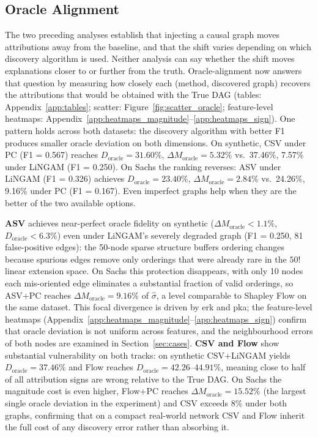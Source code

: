 \documentclass[12pt,letterpaper,twocolumn]{article}
\begin{document}
\subsection{Oracle Alignment}
\label{sec:oracle_align}

The two preceding analyses establish that injecting a causal graph moves attributions
away from the baseline, and that the shift varies depending on which discovery algorithm
is used. Neither analysis can say whether the shift moves explanations closer to or
further from the truth. Oracle-alignment now answers that question by measuring how
closely each (method, discovered graph) recovers the attributions that would be obtained
with the True DAG (tables: Appendix~\ref{app:tables}; scatter:
Figure~\ref{fig:scatter_oracle}; feature-level heatmaps:
Appendix~\ref{app:heatmaps_magnitude}--\ref{app:heatmaps_sign}). One pattern holds across both datasets: the discovery algorithm with better F1 produces smaller oracle deviation on
both dimensions. On synthetic, CSV under PC (F1 = 0.567) reaches
$D_{\text{oracle}} = 31.60\%$, $\Delta M_{\text{oracle}} = 5.32\%$ vs.\ 37.46\%,
7.57\% under LiNGAM (F1 = 0.250). On Sachs the ranking reverses: ASV under LiNGAM
(F1 = 0.326) achieves $D_{\text{oracle}} = 23.40\%$, $\Delta M_{\text{oracle}} = 2.84\%$
vs.\ 24.26\%, 9.16\% under PC (F1 = 0.167). Even imperfect graphs help when they are
the better of the two available options.

\textbf{ASV} achieves near-perfect oracle fidelity on synthetic
($\Delta M_{\text{oracle}} < 1.1\%$, $D_{\text{oracle}} < 6.3\%$) even under LiNGAM's
severely degraded graph (F1 = 0.250, 81 false-positive edges): the 50-node sparse
structure buffers ordering changes because spurious edges remove only orderings that were
already rare in the $50!$ linear extension space. On Sachs this protection disappears,
with only 10 nodes each mis-oriented edge eliminates a substantial fraction of valid
orderings, so ASV+PC reaches $\Delta M_{\text{oracle}} = 9.16\%$ of $\hat{\sigma}$, a
level comparable to Shapley Flow on the same dataset. This focal divergence is driven
by erk and pka; the feature-level heatmaps
(Appendix~\ref{app:heatmaps_magnitude}--\ref{app:heatmaps_sign}) confirm that oracle
deviation is not uniform across features, and the neighbourhood errors of both nodes
are examined in Section~\ref{sec:cases}.
\textbf{CSV and Flow} show substantial vulnerability on both tracks: on synthetic
CSV+LiNGAM yields $D_{\text{oracle}} = 37.46\%$ and Flow reaches
$D_{\text{oracle}} = 42.26$--$44.91\%$, meaning close to half of all attribution signs
are wrong relative to the True DAG. On Sachs the magnitude cost is even higher,
Flow+PC reaches $\Delta M_{\text{oracle}} = 15.52\%$ (the largest single oracle
deviation in the experiment) and CSV exceeds $8\%$ under both graphs, confirming that
on a compact real-world network CSV and Flow inherit the full cost of any discovery
error rather than absorbing it.
\end{document}
